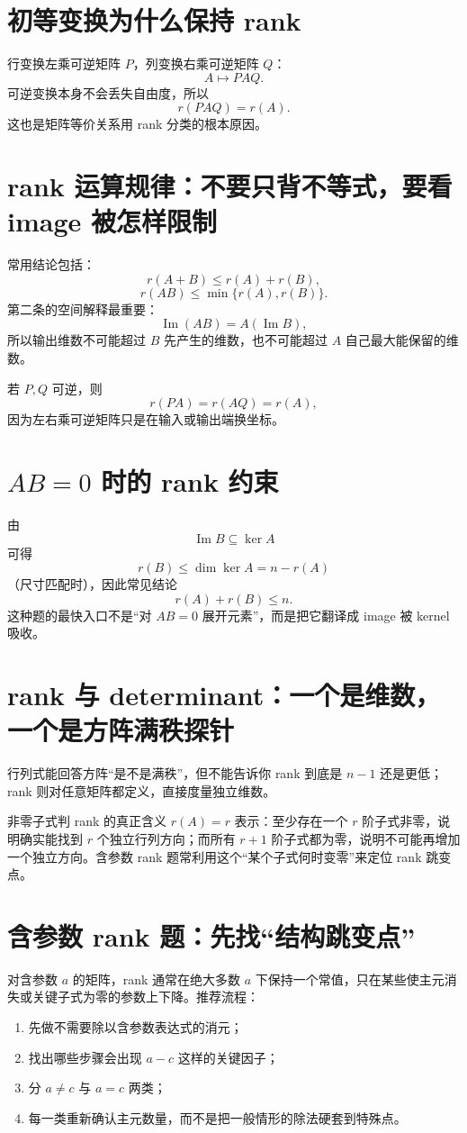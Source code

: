 \documentclass[11pt,a4paper,openany]{ctexbook}
\begin{document}
\section{初等变换为什么保持 rank}
行变换左乘可逆矩阵 $P$，列变换右乘可逆矩阵 $Q$：
\[
A\mapsto PAQ.
\]
可逆变换本身不会丢失自由度，所以
\[
\boxed{r(PAQ)=r(A)}.
\]
这也是矩阵等价关系用 rank 分类的根本原因。

\section{rank 运算规律：不要只背不等式，要看 image 被怎样限制}
常用结论包括：
\[
r(A+B)\le r(A)+r(B),
\]
\[
r(AB)\le \min\{r(A),r(B)\}.
\]
第二条的空间解释最重要：
\[
\operatorname{Im}(AB)=A(\operatorname{Im}B),
\]
所以输出维数不可能超过 $B$ 先产生的维数，也不可能超过 $A$ 自己最大能保留的维数。

若 $P,Q$ 可逆，则
\[
r(PA)=r(AQ)=r(A),
\]
因为左右乘可逆矩阵只是在输入或输出端换坐标。

\section{$AB=0$ 时的 rank 约束}
由
\[
\operatorname{Im}B\subseteq\ker A
\]
可得
\[
r(B)\le \dim\ker A=n-r(A)
\]
（尺寸匹配时），因此常见结论
\[
\boxed{r(A)+r(B)\le n.}
\]
这种题的最快入口不是“对 $AB=0$ 展开元素”，而是把它翻译成 image 被 kernel 吸收。

\section{rank 与 determinant：一个是维数，一个是方阵满秩探针}
行列式能回答方阵“是不是满秩”，但不能告诉你 rank 到底是 $n-1$ 还是更低；rank 则对任意矩阵都定义，直接度量独立维数。

\begin{boundarybox}{非零子式判 rank 的真正含义}
$r(A)=r$ 表示：至少存在一个 $r$ 阶子式非零，说明确实能找到 $r$ 个独立行列方向；而所有 $r+1$ 阶子式都为零，说明不可能再增加一个独立方向。含参数 rank 题常利用这个“某个子式何时变零”来定位 rank 跳变点。
\end{boundarybox}

\section{含参数 rank 题：先找“结构跳变点”}
对含参数 $a$ 的矩阵，rank 通常在绝大多数 $a$ 下保持一个常值，只在某些使主元消失或关键子式为零的参数上下降。推荐流程：
\begin{enumerate}
  \item 先做不需要除以含参数表达式的消元；
  \item 找出哪些步骤会出现 $a-c$ 这样的关键因子；
  \item 分 $a\neq c$ 与 $a=c$ 两类；
  \item 每一类重新确认主元数量，而不是把一般情形的除法硬套到特殊点。
\end{enumerate}
\end{document}
